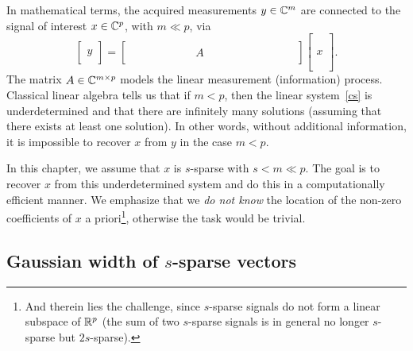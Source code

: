 In mathematical terms, the acquired measurements $y \in \mathbb{C}^m$ are connected to the signal  of interest $x \in \mathbb{C}^p$, with $m \ll p$, via 
\begin{equation}\label{cs}
\left[\begin{array}{c} \\ y \\ \  \end{array}\right] = \left[\begin{array}{cccccccccccccccccc} \\  & & & & & &  & A & & & & & & & & & & \\ \  \end{array}\right] \left[\begin{array}{c}  \\ \\ \\ x \\ \\ \\ \   \end{array}\right].
\end{equation}
The matrix $A \in\mathbb{C}^{m \times p}$ models the linear measurement (information) process. Classical linear algebra tells us that if $m < p$, then the linear system~\eqref{cs} is underdetermined and that there are infinitely many solutions (assuming that there exists at least one solution). In other words, without additional information, it is impossible to
recover $x$ from $y$ in the case $m < p$.

In this chapter, we assume that $x$ is $s$-sparse with $s<m\ll p$. The goal is to recover $x$ from this underdetermined system and do this in a computationally efficient manner.
We emphasize that we {\em do not  know} the location of the non-zero coefficients of $x$ a priori\footnote{And therein lies the challenge, since $s$-sparse signals  do not form a linear subspace of $\mathbb{R}^p$ (the sum of two $s$-sparse signals is in general no longer $s$-sparse but $2s$-sparse).}, otherwise the task would be trivial.




\subsection{Gaussian width of $s$-sparse vectors}\label{ss:gausswidth}




